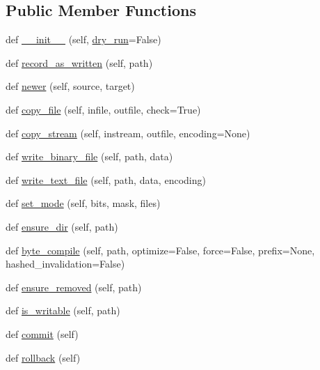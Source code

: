 \subsection*{Public Member Functions}
\begin{DoxyCompactItemize}
\item 
def \hyperlink{classpip_1_1__vendor_1_1distlib_1_1util_1_1FileOperator_a956f543f68c3a82f66bd47771f4ab0fa}{\+\_\+\+\_\+init\+\_\+\+\_\+} (self, \hyperlink{classpip_1_1__vendor_1_1distlib_1_1util_1_1FileOperator_adc669618b4578003f30e8f4578942fdd}{dry\+\_\+run}=False)
\item 
def \hyperlink{classpip_1_1__vendor_1_1distlib_1_1util_1_1FileOperator_a90b884b39270a7e8f4dd5194ad2c103c}{record\+\_\+as\+\_\+written} (self, path)
\item 
def \hyperlink{classpip_1_1__vendor_1_1distlib_1_1util_1_1FileOperator_ac18845caf1450573b6a89cda6982db17}{newer} (self, source, target)
\item 
def \hyperlink{classpip_1_1__vendor_1_1distlib_1_1util_1_1FileOperator_ab6f5d025c2a11b3d3bb919fbeccef9bf}{copy\+\_\+file} (self, infile, outfile, check=True)
\item 
def \hyperlink{classpip_1_1__vendor_1_1distlib_1_1util_1_1FileOperator_a36d63006110a7273adfc93efba26253b}{copy\+\_\+stream} (self, instream, outfile, encoding=None)
\item 
def \hyperlink{classpip_1_1__vendor_1_1distlib_1_1util_1_1FileOperator_a51dd5e88311a499a63552fa0d1f0e3f1}{write\+\_\+binary\+\_\+file} (self, path, data)
\item 
def \hyperlink{classpip_1_1__vendor_1_1distlib_1_1util_1_1FileOperator_ac32bdeacdd15a9c7f3d77fbde3c06279}{write\+\_\+text\+\_\+file} (self, path, data, encoding)
\item 
def \hyperlink{classpip_1_1__vendor_1_1distlib_1_1util_1_1FileOperator_af3bc01eadad6aa27baacdfad822325b6}{set\+\_\+mode} (self, bits, mask, files)
\item 
def \hyperlink{classpip_1_1__vendor_1_1distlib_1_1util_1_1FileOperator_a8120aac76979a816cab95f1590e5c4f3}{ensure\+\_\+dir} (self, path)
\item 
def \hyperlink{classpip_1_1__vendor_1_1distlib_1_1util_1_1FileOperator_ad3919b43a573b10b426e7f2a1b5713cc}{byte\+\_\+compile} (self, path, optimize=False, force=False, prefix=None, hashed\+\_\+invalidation=False)
\item 
def \hyperlink{classpip_1_1__vendor_1_1distlib_1_1util_1_1FileOperator_a3ea16db79ef79ea436f214139dd5d292}{ensure\+\_\+removed} (self, path)
\item 
def \hyperlink{classpip_1_1__vendor_1_1distlib_1_1util_1_1FileOperator_a28e0e4507a9ebcc82427dc05c0b722f7}{is\+\_\+writable} (self, path)
\item 
def \hyperlink{classpip_1_1__vendor_1_1distlib_1_1util_1_1FileOperator_a881309fd609956f7aa4357bef0600adb}{commit} (self)
\item 
def \hyperlink{classpip_1_1__vendor_1_1distlib_1_1util_1_1FileOperator_a1566a2a8bc712511e2a33cbd83bbb3e2}{rollback} (self)
\end{DoxyCompactItemize}
